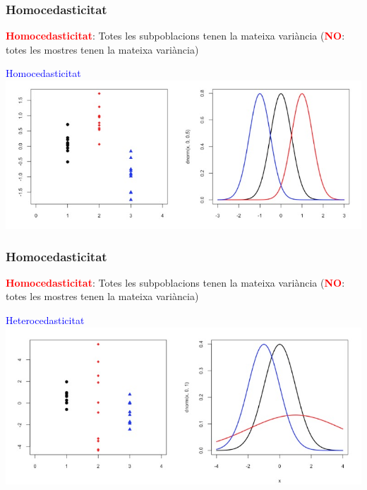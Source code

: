 \documentclass[12pt,t]{beamer}
\newcommand{\red}[1]{\textcolor{red}{#1}}
\newcommand{\blue}[1]{\textcolor{blue}{#1}}
\theoremstyle{plain}
\theoremstyle{definition}
\begin{document}
\begin{frame}
\frametitle{Homocedasticitat}

\red{\bf Homocedasticitat}: Totes les subpoblacions tenen la mateixa variància  (\red{\bf NO}: totes les mostres tenen la mateixa variància)

\begin{center}
\blue{Homocedasticitat}\\[1ex]
\includegraphics[width=\linewidth]{homoc}
\end{center}

\end{frame}

\begin{frame}
\frametitle{Homocedasticitat}

\red{\bf Homocedasticitat}: Totes les subpoblacions tenen la mateixa variància  (\red{\bf NO}: totes les mostres tenen la mateixa variància)

\begin{center}
\blue{Heterocedasticitat}\\[1ex]
\includegraphics[width=\linewidth]{heteroc}
\end{center}

\end{frame}
\end{document}
